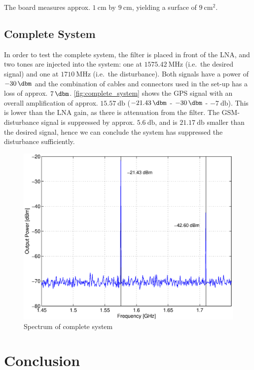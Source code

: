 \documentclass[a4paper]{article}        %
\begin{document}
  The board measures approx. $\SI{1}{\centi\meter}$ by $\SI{9}{\centi\meter}$, yielding a surface of $\SI{9}{\centi\meter\squared}$.
  \subsection{Complete System}
  In order to test the complete system, the filter is placed in front of the LNA, and two tones are injected into the system: one at $\SI{1575.42}{\mega\hertz}$ (i.e.\ the desired signal) and one at $\SI{1710}{\mega\hertz}$ (i.e.\ the disturbance).  
  Both signals have a power of $\SI{-30}{\dbm}$ and the combination of cables and connectors used in the set-up has a loss of approx. $\SI{7}{\dbm}$.
  \autoref{fig:complete_system} shows the GPS signal with an overall amplification of approx. $\SI{15.57}{\decibel}$ ($\SI{-21.43}{\dbm}$ - $\SI{-30}{\dbm}$ - $\SI{-7}{\decibel}$). This is lower than the LNA gain, as there is attenuation from the filter.
  The GSM-disturbance signal is suppressed by approx. $\SI{5.6}{\decibel}$, and is $\SI{21.17}{\decibel}$ smaller than the desired signal, hence we can conclude the system has suppressed the disturbance sufficiently.
  \begin{figure}[H]
    \centering
    \includegraphics[width=\textwidth]{fig/Filter/spectrum_system.eps}
    \caption{Spectrum of complete system}
    \label{fig:complete_system}
  \end{figure}
\section{Conclusion}
\end{document}
